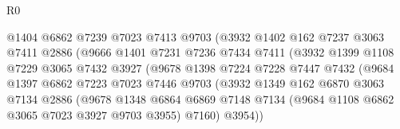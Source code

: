\begin{lexlean}{R0}
\begin{coremodule}
                                  @1404
                                  @6862
                                  @7239
                                  @7023
                                  @7413
                                  @9703
                                  (@3932
                                    @1402
                                    @162
                                    @7237
                                    @3063
                                    @7411
                                    @2886
                                    (@9666
                                      @1401
                                      @7231
                                      @7236
                                      @7434
                                      @7411
                                      (@3932
                                        @1399
                                        @1108
                                        @7229
                                        @3065
                                        @7432
                                        @3927
                                        (@9678
                                          @1398
                                          @7224
                                          @7228
                                          @7447
                                          @7432
                                          (@9684
                                            @1397
                                            @6862
                                            @7223
                                            @7023
                                            @7446
                                            @9703
                                            (@3932
                                              @1349
                                              @162
                                              @6870
                                              @3063
                                              @7134
                                              @2886
                                              (@9678
                                                @1348
                                                @6864
                                                @6869
                                                @7148
                                                @7134
                                                (@9684 @1108 @6862 @3065 @7023 @3927 @9703 @3955)
                                                @7160)
                                              @3954))

\end{coremodule}
\end{lexlean}
